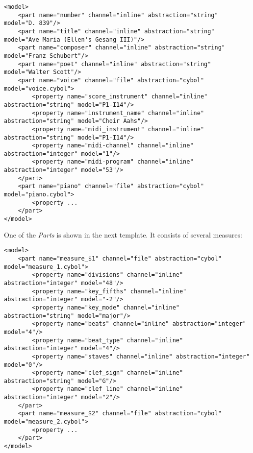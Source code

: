 \begin{scriptsize}
    \begin{verbatim}
<model>
    <part name="number" channel="inline" abstraction="string" model="D. 839"/>
    <part name="title" channel="inline" abstraction="string" model="Ave Maria (Ellen's Gesang III)"/>
    <part name="composer" channel="inline" abstraction="string" model="Franz Schubert"/>
    <part name="poet" channel="inline" abstraction="string" model="Walter Scott"/>
    <part name="voice" channel="file" abstraction="cybol" model="voice.cybol">
        <property name="score_instrument" channel="inline" abstraction="string" model="P1-I14"/>
        <property name="instrument_name" channel="inline" abstraction="string" model="Choir Aahs"/>
        <property name="midi_instrument" channel="inline" abstraction="string" model="P1-I14"/>
        <property name="midi-channel" channel="inline" abstraction="integer" model="1"/>
        <property name="midi-program" channel="inline" abstraction="integer" model="53"/>
    </part>
    <part name="piano" channel="file" abstraction="cybol" model="piano.cybol">
        <property ...
    </part>
</model>
    \end{verbatim}
\end{scriptsize}

One of the \emph{Parts} is shown in the next template. It consists of several measures:

\begin{scriptsize}
    \begin{verbatim}
<model>
    <part name="measure_$1" channel="file" abstraction="cybol" model="measure_1.cybol">
        <property name="divisions" channel="inline" abstraction="integer" model="48"/>
        <property name="key_fifths" channel="inline" abstraction="integer" model="-2"/>
        <property name="key_mode" channel="inline" abstraction="string" model="major"/>
        <property name="beats" channel="inline" abstraction="integer" model="4"/>
        <property name="beat_type" channel="inline" abstraction="integer" model="4"/>
        <property name="staves" channel="inline" abstraction="integer" model="0"/>
        <property name="clef_sign" channel="inline" abstraction="string" model="G"/>
        <property name="clef_line" channel="inline" abstraction="integer" model="2"/>
    </part>
    <part name="measure_$2" channel="file" abstraction="cybol" model="measure_2.cybol">
        <property ...
    </part>
</model>
    \end{verbatim}
\end{scriptsize}

